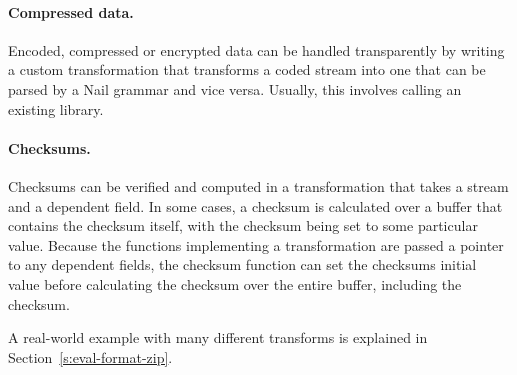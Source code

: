 \paragraph{Compressed data.}
Encoded, compressed or encrypted data can be handled transparently by writing a custom
transformation that transforms a coded stream into one that can be parsed by a Nail grammar and vice
versa. Usually, this involves calling an existing library.

\paragraph{Checksums.}
Checksums can be verified and computed in a transformation that takes a stream and a dependent
field. In some cases, a checksum is calculated over a buffer that contains the checksum itself, with
the checksum being set to some particular value. Because the functions implementing a transformation
are passed a pointer to any dependent fields, the checksum function can set the checksums initial
value before calculating the checksum over the entire buffer, including the checksum.


\noindent A real-world example with many different transforms is explained in Section~\ref{s:eval-format-zip}.
 






